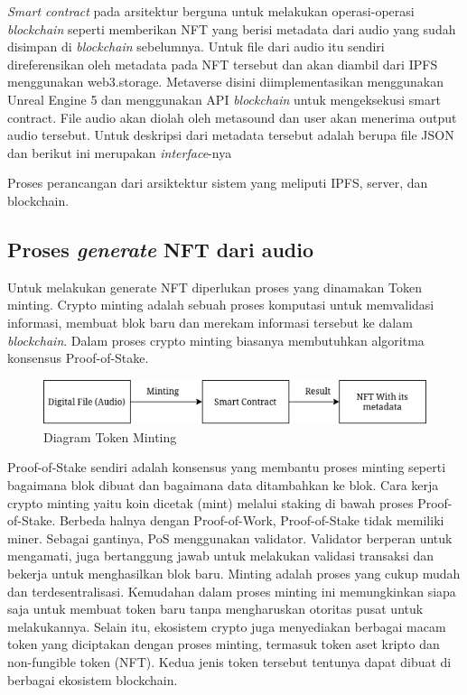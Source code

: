 \emph{Smart contract} pada arsitektur berguna untuk melakukan operasi-operasi \emph{blockchain} seperti
memberikan NFT yang berisi metadata dari audio yang sudah disimpan di \emph{blockchain} sebelumnya.
Untuk file dari audio itu sendiri direferensikan oleh metadata pada NFT tersebut dan akan diambil dari
IPFS menggunakan web3.storage. Metaverse disini diimplementasikan menggunakan Unreal Engine 5 dan menggunakan API
\emph{blockchain} untuk mengeksekusi smart contract. File audio akan diolah oleh metasound dan user akan menerima output audio tersebut.
Untuk deskripsi dari metadata tersebut adalah berupa file JSON dan berikut ini merupakan \emph{interface}-nya


Proses perancangan dari arsiktektur sistem yang meliputi IPFS, server, dan blockchain.

\subsection{Proses \emph{generate} NFT dari audio}

Untuk melakukan generate NFT diperlukan proses yang dinamakan Token minting.
Crypto minting adalah sebuah proses komputasi untuk memvalidasi informasi, membuat blok baru dan merekam informasi tersebut ke dalam \emph{blockchain}.
Dalam proses crypto minting biasanya membutuhkan algoritma konsensus Proof-of-Stake.

\begin{figure} [ht] \centering
  \includegraphics[scale=0.55]{gambar/mintingtoken.png}
  \caption{Diagram Token Minting}
  \label{fig:mintingtoken}
\end{figure}

Proof-of-Stake sendiri adalah konsensus yang membantu proses minting seperti bagaimana blok dibuat dan bagaimana data ditambahkan ke blok. Cara kerja crypto minting yaitu koin dicetak (mint) melalui staking di bawah proses Proof-of-Stake. Berbeda halnya dengan Proof-of-Work, Proof-of-Stake tidak memiliki miner. Sebagai gantinya, PoS menggunakan validator. Validator berperan untuk mengamati, juga bertanggung jawab untuk melakukan validasi transaksi dan bekerja untuk menghasilkan blok baru.
Minting adalah proses yang cukup mudah dan terdesentralisasi. Kemudahan dalam proses  minting ini memungkinkan siapa saja untuk membuat token baru tanpa mengharuskan otoritas pusat untuk melakukannya.
Selain itu, ekosistem crypto juga menyediakan berbagai macam token yang diciptakan dengan proses minting, termasuk token aset kripto dan non-fungible token (NFT). Kedua jenis token tersebut tentunya dapat dibuat di berbagai ekosistem blockchain.

